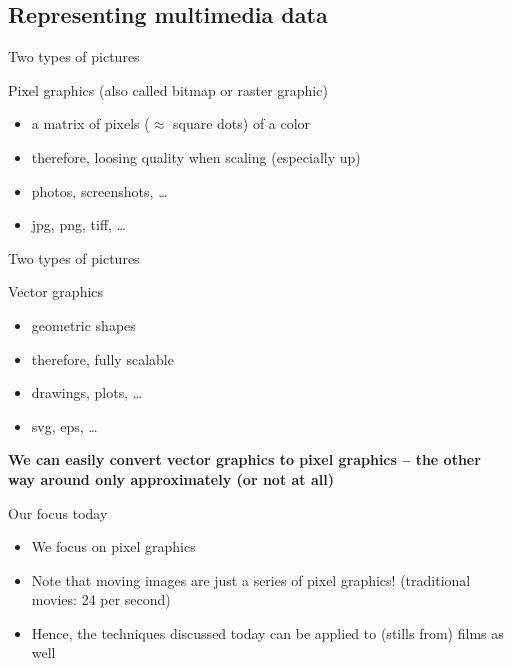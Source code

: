 

\subsection{Representing multimedia data}

\begin{frame}{Two types of pictures}
  \begin{block}{Pixel graphics (also called bitmap or raster graphic)}
    \begin{itemize}
    \item a matrix of pixels ($\approx$ square dots) of a color
    \item therefore, loosing quality when scaling (especially  up)
    \item photos, screenshots, \ldots
    \item jpg, png, tiff, \ldots
    \end{itemize}
  \end{block}
\end{frame}

\begin{frame}{Two types of pictures}
  \begin{block}{Vector graphics}
    \begin{itemize}
    \item geometric shapes
    \item therefore, fully scalable
    \item drawings, plots, \ldots
    \item svg, eps, \ldots
    \end{itemize}
  \end{block}
  \pause

  \textbf{We can easily convert vector graphics to pixel graphics -- the other way around only approximately (or not at all)}
\end{frame}





\begin{frame}{Our focus today}
  \begin{itemize}
  \item We focus on pixel graphics
  \item Note that moving images are just a series of pixel graphics! (traditional movies: 24 per second)
  \item Hence, the techniques discussed today can be applied to (stills from) films as well
  \end{itemize}
\end{frame}


